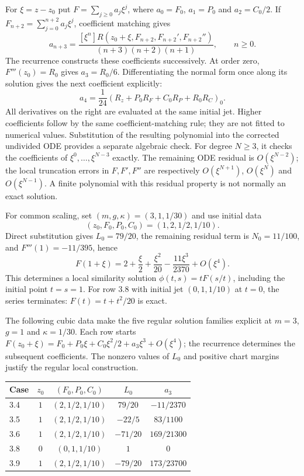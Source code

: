 For $\xi=z-z_0$ put $F=\sum_{j\geq0}a_j\xi^j$, where
$a_0=F_0$, $a_1=P_0$ and $a_2=C_0/2$. If
$F_{n+2}=\sum_{j=0}^{n+2}a_j\xi^j$, coefficient matching gives
\begin{equation}
 a_{n+3}=
 \frac{[\xi^n]R(z_0+\xi,F_{n+2},F_{n+2}',F_{n+2}'')}
 {(n+3)(n+2)(n+1)},\qquad n\geq0.
 \label{eq:sve-series-recurrence}
\end{equation}
The recurrence constructs these coefficients successively. At order zero,
$F'''(z_0)=R_0$ gives $a_3=R_0/6$. Differentiating the normal form once
along its solution gives the next coefficient explicitly:
\[
 a_4=\frac1{24}\left(R_z+P_0R_F+C_0R_P+R_0R_C\right)_0.
\]
All derivatives on the right are evaluated at the same initial jet. Higher
coefficients follow by the same coefficient-matching rule; they are not
fitted to numerical values. Substitution of the resulting polynomial into
the corrected undivided ODE provides a separate algebraic check. For degree $N\geq3$, it checks the coefficients of
$\xi^0,\ldots,\xi^{N-3}$ exactly. The remaining ODE residual is
$O(\xi^{N-2})$; the local truncation errors in $F,F',F''$ are respectively
$O(\xi^{N+1})$, $O(\xi^N)$ and $O(\xi^{N-1})$. A finite polynomial with
this residual property is not normally an exact solution.

For common scaling, set $(m,g,\kappa)=(3,1,1/30)$ and use initial data
\[
 (z_0,F_0,P_0,C_0)=(1,2,1/2,1/10).
\]
Direct substitution gives
$L_0=79/20$, the remaining residual term is $N_0=11/100$, and $F'''(1)=-11/395$, hence
\[
 F(1+\xi)=2+\frac{\xi}{2}+\frac{\xi^2}{20}
             -\frac{11\xi^3}{2370}+O(\xi^4).
\]
This determines a local similarity solution $\phi(t,s)=tF(s/t)$, including
the initial point $t=s=1$. For row 3.8 with initial jet $(0,1,1/10)$ at
$t=0$, the series terminates: $F(t)=t+t^2/20$ is exact.

The following cubic data make the five regular solution families explicit
at $m=3$, $g=1$ and $\kappa=1/30$. Each row starts
$F(z_0+\xi)=F_0+P_0\xi+C_0\xi^2/2+a_3\xi^3+O(\xi^4)$;
the recurrence determines the subsequent coefficients. The nonzero values
of $L_0$ and positive chart margins justify the regular local construction.
\begin{center}\small
\begin{tabular}{@{}lcccc@{}}
\toprule
Case & $z_0$ & $(F_0,P_0,C_0)$ & $L_0$ & $a_3$\\
\midrule
3.4 & $1$ & $(2,1/2,1/10)$ & $79/20$ & $-11/2370$\\
3.5 & $1$ & $(2,1/2,1/10)$ & $-22/5$ & $83/1100$\\
3.6 & $1$ & $(2,1/2,1/10)$ & $-71/20$ & $169/21300$\\
3.8 & $0$ & $(0,1,1/10)$ & $1$ & $0$\\
3.9 & $1$ & $(2,1/2,1/10)$ & $-79/20$ & $173/23700$\\
\bottomrule
\end{tabular}
\end{center}

